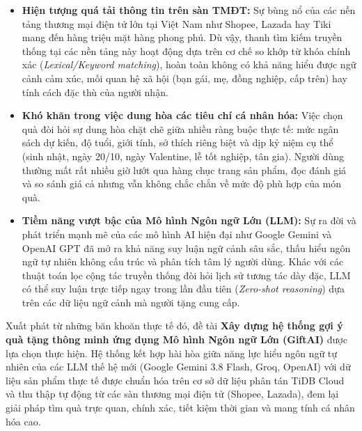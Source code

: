 \begin{itemize}[leftmargin=1.2cm, itemsep=3pt]
    \item \textbf{Hiện tượng quá tải thông tin trên sàn TMĐT:} Sự bùng nổ của các nền tảng thương mại điện tử lớn tại Việt Nam như Shopee, Lazada hay Tiki mang đến hàng triệu mặt hàng phong phú. Dù vậy, thanh tìm kiếm truyền thống tại các nền tảng này hoạt động dựa trên cơ chế so khớp từ khóa chính xác (\textit{Lexical/Keyword matching}), hoàn toàn không có khả năng hiểu được ngữ cảnh cảm xúc, mối quan hệ xã hội (bạn gái, mẹ, đồng nghiệp, cấp trên) hay tính cách đặc thù của người nhận.
    
    \item \textbf{Khó khăn trong việc dung hòa các tiêu chí cá nhân hóa:} Việc chọn quà đòi hỏi sự dung hòa chặt chẽ giữa nhiều ràng buộc thực tế: mức ngân sách dự kiến, độ tuổi, giới tính, sở thích riêng biệt và dịp kỷ niệm cụ thể (sinh nhật, ngày 20/10, ngày Valentine, lễ tốt nghiệp, tân gia). Người dùng thường mất rất nhiều giờ lướt qua hàng chục trang sản phẩm, đọc đánh giá và so sánh giá cả nhưng vẫn không chắc chắn về mức độ phù hợp của món quà.
    
    \item \textbf{Tiềm năng vượt bậc của Mô hình Ngôn ngữ Lớn (LLM):} Sự ra đời và phát triển mạnh mẽ của các mô hình AI hiện đại như Google Gemini và OpenAI GPT đã mở ra khả năng suy luận ngữ cảnh sâu sắc, thấu hiểu ngôn ngữ tự nhiên không cấu trúc và phân tích tâm lý người dùng. Khác với các thuật toán lọc cộng tác truyền thống đòi hỏi lịch sử tương tác dày đặc, LLM có thể suy luận trực tiếp ngay trong lần đầu tiên (\textit{Zero-shot reasoning}) dựa trên các dữ liệu ngữ cảnh mà người tặng cung cấp.
\end{itemize}

Xuất phát từ những băn khoăn thực tế đó, đề tài \textbf{\guillemotleft Xây dựng hệ thống gợi ý quà tặng thông minh ứng dụng Mô hình Ngôn ngữ Lớn (GiftAI)\guillemotright} được lựa chọn thực hiện. Hệ thống kết hợp hài hòa giữa năng lực hiểu ngôn ngữ tự nhiên của các LLM thế hệ mới (Google Gemini 3.8 Flash, Groq, OpenAI) với dữ liệu sản phẩm thực tế được chuẩn hóa trên cơ sở dữ liệu phân tán TiDB Cloud và thu thập tự động từ các sàn thương mại điện tử (Shopee, Lazada), đem lại giải pháp tìm quà trực quan, chính xác, tiết kiệm thời gian và mang tính cá nhân hóa cao.


